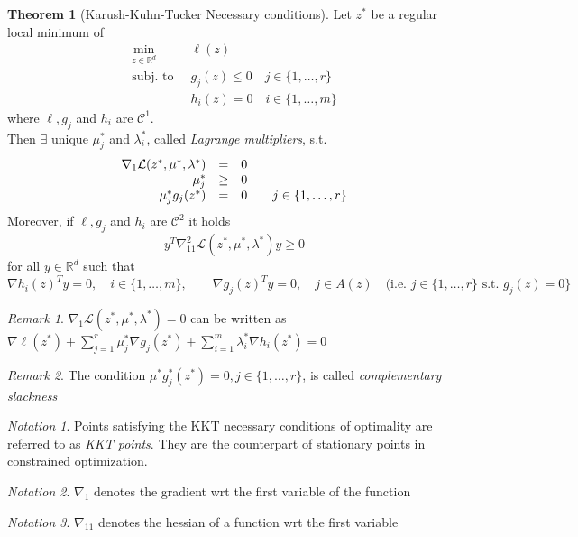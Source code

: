 \documentclass[openany]{book}
\newcommand{\R}{\mathbb{R}}                %
\theoremstyle{definition}
\newtheorem{theorem}{Theorem}[section]
\theoremstyle{remark}
\newtheorem*{remark}{Remark}
\newtheorem*{notation}{Notation}
\begin{document}
\begin{theorem}[Karush-Kuhn-Tucker Necessary conditions]
    Let $z^*$ be a regular local minimum of 
    \begin{align*}
        \min_{z\in\R^d}\  &\ell(z) \\
        \text{subj. to }\  & g_j(z)\leq 0 \quad j\in\{1,\dots,r\}\\
        & h_i(z)=0 \quad i\in\{1,\dots,m\}
    \end{align*}
    where $\ell,g_j$ and $h_i$ are $\mathcal{C}^1$. \\
    Then $\exists$ unique $\mu_j^*$ and $\lambda_i^*$, called \emph{Lagrange multipliers}, s.t.
    \[
        \begin{array}{ r c l}
            \nabla_1\mathcal{L}(z^*,\mu^*,\lambda^*) & = & 0 \\             \mu_j^* & \geq & 0 \\
            \mu^*_jg_j(z^*) & = & 0 \qquad j\in \{1,\dots,r\} 
        \end{array}
    \]
    Moreover, if $\ell, g_j$ and $h_i$ are $\mathcal{C}^2$ it holds
    \[
        y^T\nabla_{11}^2\mathcal{L}(z^*,\mu^*,\lambda^*)y \geq 0
    \]
    for all $y\in\R^d$ such that
    \[
    \nabla h_i(z)^Ty = 0, \quad i\in\{1,\dots,m\}, \qquad \nabla g_j(z)^Ty = 0, \quad j\in A(z) \quad \text{(i.e. } j\in\{1,\dots,r\} \text{ s.t. } g_j(z)=0\}
\]
\end{theorem}
\begin{remark}
    $\nabla_1\mathcal{L}(z^*,\mu^*,\lambda^*) = 0$ can be written as 
    $\nabla\ell(z^*)+\displaystyle\sum_{j=1}^{r}\mu_j^*\nabla g_j(z^*)+\displaystyle\sum_{i=1}^{m}\lambda_i^*\nabla h_i(z^*)=0$
\end{remark}
\begin{remark}
    The condition $\mu^*g_j^*(z^*)=0,j\in\{1,\dots,r\}$, is called \emph{complementary slackness}
\end{remark}
\begin{notation}
    Points satisfying the KKT necessary conditions of optimality are referred to as \emph{KKT points}. They are the counterpart of stationary points in constrained optimization.
\end{notation}
\begin{notation}
    $\nabla_1$ denotes the gradient wrt the first variable of the function
\end{notation}
\begin{notation}
    $\nabla_{11}$ denotes the hessian of a function wrt the first variable
\end{notation}
\end{document}
